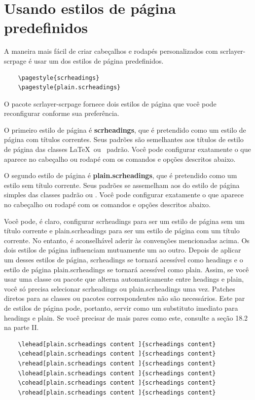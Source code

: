 \chapter{Usando estilos de página predefinidos}
A maneira mais fácil de criar cabeçalhos e rodapés personalizados com scrlayer-scrpage é usar um dos estilos de página predefinidos.

\begin{verbatim}
    \pagestyle{scrheadings}
    \pagestyle{plain.scrheadings} 
\end{verbatim}

O pacote scrlayer-scrpage fornece dois estilos de página que você pode reconfigurar conforme sua preferência.

O primeiro estilo de página é \textbf{scrheadings}, que é pretendido como um estilo de página com títulos correntes. Seus padrões são semelhantes aos títulos de estilo de página das classes \LaTeX\ ou \KOMAScript\ padrão. Você pode configurar exatamente o que aparece no cabeçalho ou rodapé com os comandos e opções descritos abaixo.

O segundo estilo de página é \textbf{plain.scrheadings}, que é pretendido como um estilo sem título corrente. Seus padrões se assemelham aos do estilo de página simples das classes padrão ou \KOMAScript. Você pode configurar exatamente o que aparece no cabeçalho ou rodapé com os comandos e opções descritos abaixo.

Você pode, é claro, configurar scrheadings para ser um estilo de página sem um título corrente e plain.scrheadings para ser um estilo de página com um título corrente. No entanto, é aconselhável aderir às convenções mencionadas acima. Os dois estilos de página influenciam mutuamente um ao outro. Depois de aplicar um desses estilos de página, scrheadings se tornará acessível como headings e o estilo de página plain.scrheadings se tornará acessível como plain. Assim, se você usar uma classe ou pacote que alterna automaticamente entre headings e plain, você só precisa selecionar scrheadings ou plain.scrheadings uma vez. Patches diretos para as classes ou pacotes correspondentes não são necessários. Este par de estilos de página pode, portanto, servir como um substituto imediato para headings e plain. Se você precisar de mais pares como este, consulte a seção 18.2 na parte II.
\begin{verbatim}
    \lehead[plain.scrheadings content ]{scrheadings content}
    \cehead[plain.scrheadings content ]{scrheadings content}
    \rehead[plain.scrheadings content ]{scrheadings content}
    \lohead[plain.scrheadings content ]{scrheadings content}
    \cohead[plain.scrheadings content ]{scrheadings content}
    \rohead[plain.scrheadings content ]{scrheadings content}
\end{verbatim}

